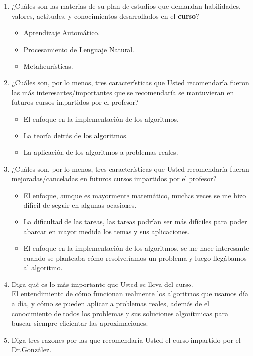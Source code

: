 \begin{enumerate}
\begin{itemize}
\item Problemas NP-Completos.
\end{itemize}
\item ¿Cuáles son las materias de su plan de estudios que demandan habilidades, valores, actitudes, y conocimientos desarrollados en el \textbf{curso}?  
\begin{itemize}
\item Aprendizaje Automático.
\item Procesamiento de Lenguaje Natural.
\item Metaheurísticas.
\end{itemize}
\item ¿Cuáles son, por lo menos, tres características que Usted recomendaría fueron las más interesantes/importantes  
que se recomendaría se mantuvieran en futuros cursos impartidos por el profesor?
\begin{itemize}
\item El enfoque en la implementación de los algoritmos.
\item La teoría detrás de los algoritmos.
\item La aplicación de los algoritmos a problemas reales.
\end{itemize}
\item ¿Cuáles son, por lo menos, tres características que Usted recomendaría fueran mejoradas/canceladas en futuros cursos impartidos por el profesor?  
\begin{itemize}
\item El enfoque, aunque es mayormente matemático, muchas veces se me hizo difícil de seguir en algunas ocasiones.
\item La dificultad de las tareas, las tareas podrían ser más difíciles para poder abarcar en mayor medida los temas y sus aplicaciones.
\item El enfoque en la implementación de los algoritmos, se me hace interesante cuando se planteaba cómo resolveríamos un problema y luego llegábamos al algoritmo.
\end{itemize}
\item Diga qué es lo más importante que Usted se lleva del curso.\\
El entendimiento de cómo funcionan realmente los algoritmos que usamos día a día, y cómo se pueden aplicar a problemas reales, además
de el conocimiento de todos los problemas y sus soluciones algorítmicas para buscar siempre eficientar las aproximaciones.
\item Diga tres razones por las que recomendaría Usted el curso impartido por el Dr.González.  

\end{enumerate}
